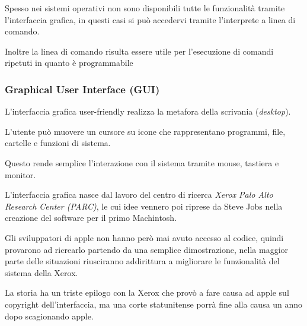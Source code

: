\begin{note}
    Spesso nei sistemi operativi non sono disponibili tutte le funzionalità tramite l'interfaccia grafica, in questi casi si può accedervi tramite l'interprete a linea di comando.

    \spacer[4pt]
    Inoltre la linea di comando risulta essere utile per l'esecuzione di comandi ripetuti in quanto è programmabile
\end{note}

\subsubsection*{Graphical User Interface (GUI)}

L'interfaccia grafica user-friendly realizza la metafora della scrivania (\textit{desktop}).

L'utente può muovere un cursore su icone che rappresentano programmi, file, cartelle e funzioni di sistema.

Questo rende semplice l'interazione con il sistema tramite mouse, tastiera e monitor.

\begin{note}
    L'interfaccia grafica nasce dal lavoro del centro di ricerca \textit{Xerox Palo Alto Research Center (PARC)}, le cui idee vennero poi riprese da Steve Jobs nella creazione del software per il primo Machintosh.

    \spacer[4pt]
    Gli sviluppatori di apple non hanno però mai avuto accesso al codice, quindi provarono ad ricrearlo partendo da una semplice dimostrazione, nella maggior parte delle situazioni riusciranno addirittura a migliorare le funzionalità del sistema della Xerox.

    \spacer[4pt]
    La storia ha un triste epilogo con la Xerox che provò a fare causa ad apple sul copyright dell'interfaccia, ma una corte statunitense porrà fine alla causa un anno dopo scagionando apple.
\end{note}

